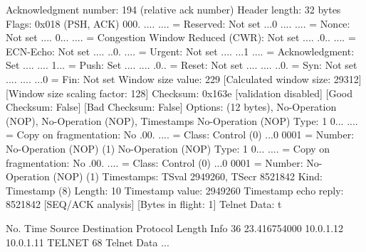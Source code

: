     Acknowledgment number: 194    (relative ack number)
    Header length: 32 bytes
    Flags: 0x018 (PSH, ACK)
        000. .... .... = Reserved: Not set
        ...0 .... .... = Nonce: Not set
        .... 0... .... = Congestion Window Reduced (CWR): Not set
        .... .0.. .... = ECN-Echo: Not set
        .... ..0. .... = Urgent: Not set
        .... ...1 .... = Acknowledgment: Set
        .... .... 1... = Push: Set
        .... .... .0.. = Reset: Not set
        .... .... ..0. = Syn: Not set
        .... .... ...0 = Fin: Not set
    Window size value: 229
    [Calculated window size: 29312]
    [Window size scaling factor: 128]
    Checksum: 0x163e [validation disabled]
        [Good Checksum: False]
        [Bad Checksum: False]
    Options: (12 bytes), No-Operation (NOP), No-Operation (NOP), Timestamps
        No-Operation (NOP)
            Type: 1
                0... .... = Copy on fragmentation: No
                .00. .... = Class: Control (0)
                ...0 0001 = Number: No-Operation (NOP) (1)
        No-Operation (NOP)
            Type: 1
                0... .... = Copy on fragmentation: No
                .00. .... = Class: Control (0)
                ...0 0001 = Number: No-Operation (NOP) (1)
        Timestamps: TSval 2949260, TSecr 8521842
            Kind: Timestamp (8)
            Length: 10
            Timestamp value: 2949260
            Timestamp echo reply: 8521842
    [SEQ/ACK analysis]
        [Bytes in flight: 1]
Telnet
    Data: t

No.     Time           Source                Destination           Protocol Length Info
     36 23.416754000   10.0.1.12             10.0.1.11             TELNET   68     Telnet Data ...

